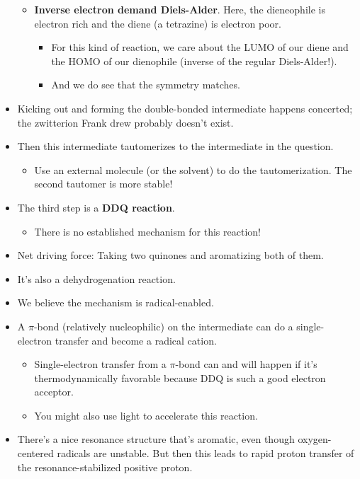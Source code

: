 \documentclass[../notes.tex]{subfiles}
\begin{document}
\begin{itemize}
\begin{itemize}
        \item \textbf{Inverse electron demand Diels-Alder}. Here, the dieneophile is electron rich and the diene (a tetrazine) is electron poor.
        \begin{itemize}
            \item For this kind of reaction, we care about the LUMO of our diene and the HOMO of our dienophile (inverse of the regular Diels-Alder!).
            \item And we do see that the symmetry matches.
        \end{itemize}
    \end{itemize}
    \item Kicking out  and forming the double-bonded intermediate happens concerted; the zwitterion Frank drew probably doesn't exist.
    \item Then this intermediate tautomerizes to the intermediate in the question.
    \begin{itemize}
        \item Use an external molecule (or the solvent) to do the tautomerization. The second tautomer is more stable!
    \end{itemize}
    \item The third step is a \textbf{DDQ reaction}.
    \begin{itemize}
        \item There is no established mechanism for this reaction!
    \end{itemize}
    \item Net driving force: Taking two quinones and aromatizing both of them.
    \item It's also a dehydrogenation reaction.
    \item We believe the mechanism is radical-enabled.
    \item A $\pi$-bond (relatively nucleophilic) on the intermediate can do a single-electron transfer and become a radical cation.
    \begin{itemize}
        \item Single-electron transfer from a $\pi$-bond can and will happen if it's thermodynamically favorable because DDQ is such a good electron acceptor.
        \item You might also use light to accelerate this reaction.
    \end{itemize}
    \item There's a nice resonance structure that's aromatic, even though oxygen-centered radicals are unstable. But then this leads to rapid proton transfer of the resonance-stabilized positive proton.

\end{itemize}
\end{document}
